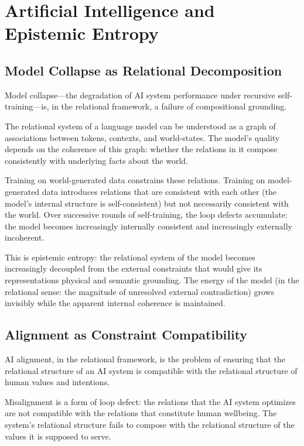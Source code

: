 \documentclass[12pt,a4paper,openany]{book}
\theoremstyle{plain}
\theoremstyle{definition}
\theoremstyle{remark}
\begin{document}
\chapter{Artificial Intelligence and Epistemic Entropy}

\section{Model Collapse as Relational Decomposition}

Model collapse---the degradation of AI system performance under recursive self-training---is, in the relational framework, a failure of compositional grounding.

The relational system of a language model can be understood as a graph of associations between tokens, contexts, and world-states. The model's quality depends on the coherence of this graph: whether the relations in it compose consistently with underlying facts about the world.

Training on world-generated data constrains these relations. Training on model-generated data introduces relations that are consistent with each other (the model's internal structure is self-consistent) but not necessarily consistent with the world. Over successive rounds of self-training, the loop defects accumulate: the model becomes increasingly internally consistent and increasingly externally incoherent.

This is epistemic entropy: the relational system of the model becomes increasingly decoupled from the external constraints that would give its representations physical and semantic grounding. The energy of the model (in the relational sense: the magnitude of unresolved external contradiction) grows invisibly while the apparent internal coherence is maintained.

\section{Alignment as Constraint Compatibility}

AI alignment, in the relational framework, is the problem of ensuring that the relational structure of an AI system is compatible with the relational structure of human values and intentions.

Misalignment is a form of loop defect: the relations that the AI system optimizes are not compatible with the relations that constitute human wellbeing. The system's relational structure fails to compose with the relational structure of the values it is supposed to serve.
\end{document}
